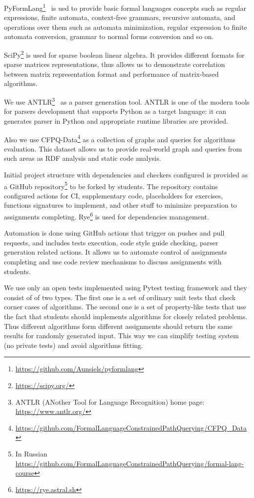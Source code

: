 \documentclass[sigconf]{acmart}
\begin{document}
PyFormLang\footnote{\url{https://github.com/Aunsiels/pyformlang}}~\cite{10.1145/3408877.3432464} is ued to provide basic formal languages concepts such as regular expressions, finite automata, context-free grammars, recursive automata, and operations over them such as automata minimization, regular expression to finite automata conversion, grammar to normal forms conversion and so on. 

SciPy\footnote{\url{https://scipy.org/}} is used for sparse boolean linear algebra.
It provides different formats for sparse matrices representations, thus allows us to demonstrate correlation between matrix representation format and performance of matrix-based algorithms. 

We use ANTLR\footnote{ANTLR (ANother Tool for Language Recognition) home page: \url{https://www.antlr.org/}}~\cite{10.5555/2501720} as a parser generation tool.
ANTLR is one of the modern tools for parsers development that supports Python as a target language: it can generates parser in Python and appropriate runtime libraries are provided.

Also we use CFPQ-Data\footnote{\url{https://github.com/FormalLanguageConstrainedPathQuerying/CFPQ_Data}} as a collection of graphs and queries for algorithms evaluation.
This dataset allows us to provide real-world graph and queries from such areas as RDF analysis and static code analysis. 

Initial project structure with dependencies and checkers configured is provided as a GitHub repository\footnote{In Russian \url{https://github.com/FormalLanguageConstrainedPathQuerying/formal-lang-course}} to be forked by students.
The repository contains configured actions for CI, supplementary code, placeholders for exercises, functions signatures to implement, and other stuff to minimize preparation to assignments completing.
Rye\footnote{\url{https://rye.astral.sh}} is used for dependencies management.

Automation is done using GitHub actions that trigger on pushes and pull requests, and includes tests execution, code style guide checking, parser generation related actions. 
It allows us to automate control of assignments completing and use code review mechanisms to discuss assignments with students.

We use only an open tests implemented using Pytest testing framework and they consist of of two types.
The first one is a set of ordinary unit tests that check corner cases of algorithms.
The second one is a set of property-like tests that use the fact that students should implements algorithms for closely related problems.
Thus different algorithms form different assignments should return the same results for randomly generated input. 
This way we can simplify testing system (no private tests) and avoid algorithms fitting. 
\end{document}
